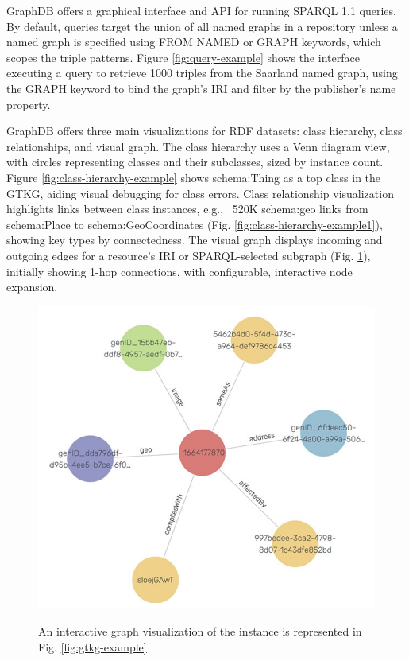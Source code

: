 \documentclass[12pt]{article}
\begin{document}
GraphDB offers a graphical interface and API for running SPARQL 1.1 queries. By default, queries target the union of all named graphs in a repository unless a named graph is specified using FROM NAMED or GRAPH keywords, which scopes the triple patterns. Figure \ref{fig:query-example} shows the interface executing a query to retrieve 1000 triples from the Saarland named graph, using the GRAPH keyword to bind the graph’s IRI and filter by the publisher’s name property.

GraphDB offers three main visualizations for RDF datasets: class hierarchy, class relationships, and visual graph. The class hierarchy uses a Venn diagram view, with circles representing classes and their subclasses, sized by instance count. Figure \ref{fig:class-hierarchy-example} shows schema:Thing as a top class in the GTKG, aiding visual debugging for class errors. Class relationship visualization highlights links between class instances, e.g., ~520K schema:geo links from schema:Place to schema:GeoCoordinates (Fig. \ref{fig:class-hierarchy-example1}), showing key types by connectedness. The visual graph displays incoming and outgoing edges for a resource’s IRI or SPARQL-selected subgraph (Fig. \ref{fig:class-hierarchy-example2}), initially showing 1-hop connections, with configurable, interactive node expansion.
\begin{figure}
    \includegraphics[width=\linewidth]{imgs/19.10.jpeg}
    \label{fig:class-hierarchy-example2}
    \caption{An interactive graph visualization of the instance is represented in Fig. \ref{fig:gtkg-example}}
\end{figure}
\end{document}
